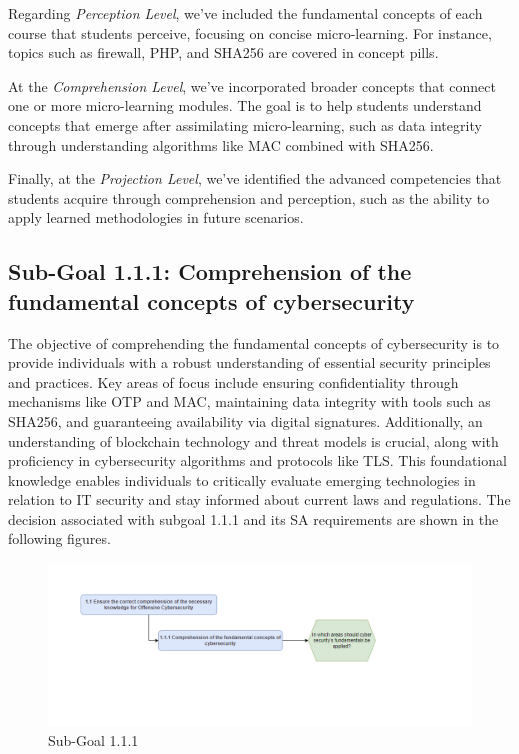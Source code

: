 Regarding \textit{Perception Level}, we've included the fundamental concepts of each course that students perceive, focusing on concise micro-learning. For instance, topics such as firewall, PHP, and SHA256 are covered in concept pills.

At the \textit{Comprehension Level}, we've incorporated broader concepts that connect one or more micro-learning modules. The goal is to help students understand concepts that emerge after assimilating micro-learning, such as data integrity through understanding algorithms like MAC combined with SHA256.

Finally, at the \textit{Projection Level}, we've identified the advanced competencies that students acquire through comprehension and perception, such as the ability to apply learned methodologies in future scenarios.


\newpage
\subsection{Sub-Goal 1.1.1: Comprehension of the fundamental concepts of cybersecurity }
The objective of comprehending the fundamental concepts of cybersecurity is to provide individuals with a robust understanding of essential security principles and practices. Key areas of focus include ensuring confidentiality through mechanisms like OTP and MAC, maintaining data integrity with tools such as SHA256, and guaranteeing availability via digital signatures. Additionally, an understanding of blockchain technology and threat models is crucial, along with proficiency in cybersecurity algorithms and protocols like TLS. This foundational knowledge enables individuals to critically evaluate emerging technologies in relation to IT security and stay informed about current laws and regulations.
The decision associated with subgoal 1.1.1 and its SA requirements are shown in the following figures.
\begin{figure}[H]
    \centering
    \includegraphics[width=\textwidth]{./assets/subgoal_1.1.1.png}
    \caption{Sub-Goal 1.1.1}
    \label{fig:subgoal_1.1.1}
\end{figure}

